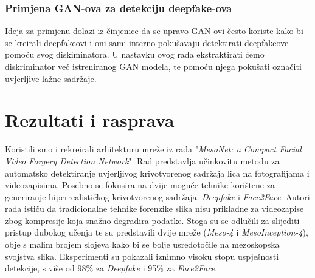 \documentclass[seminarski, times, utf8]{fer}
\begin{document}
\subsection {Primjena GAN-ova za detekciju deepfake-ova}
Ideja za primjenu dolazi iz činjenice da se upravo GAN-ovi često koriste kako bi se kreirali deepfakeovi i oni sami interno pokušavaju detektirati deepfakeove pomoću svog diskiminatora. 
U nastavku ovog rada ekstraktirati ćemo diskriminator već istreniranog GAN modela, te pomoću njega pokušati označiti uvjerljive lažne sadržaje. 

\chapter{Rezultati i rasprava}
\label{pog:rezultati_i_rasprava}
Koristili smo i rekreirali arhitekturu mreže iz rada "\textit{MesoNet: a Compact Facial Video Forgery Detection Network}\cite{mesonet}". Rad predstavlja učinkovitu metodu za automatsko detektiranje uvjerljivog krivotvorenog sadržaja lica na fotografijama i videozapisima. Posebno se fokusira na dvije moguće tehnike korištene za generiranje hiperrealističkog krivotvorenog sadržaja: \textit{Deepfake} i \textit{Face2Face}. Autori rada ističu da tradicionalne tehnike forenzike slika nisu prikladne za videozapise zbog kompresije koja snažno degradira podatke. Stoga su se odlučili za slijediti pristup dubokog učenja te su predstavili dvije mreže (\textit{Meso-4} i \textit{MesoInception-4}), obje s malim brojem slojeva kako bi se bolje usredotočile na mezoskopska svojstva slika. Eksperimenti su pokazali iznimno visoku stopu uspješnosti detekcije, s više od 98\% za \textit{Deepfake} i 95\% za \textit{Face2Face}.
\end{document}

